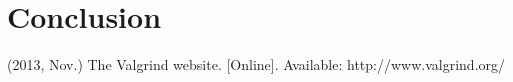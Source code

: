 \documentclass[conference]{IEEEtran}
\begin{document}
\section{Conclusion}
\label{sec:conclusion}






% 
% 







%
%
%


\begin{thebibliography}{1}
% 
(2013, Nov.) The Valgrind website. [Online]. Available: http://www.valgrind.org/
% 
\end{thebibliography}




\end{document}
